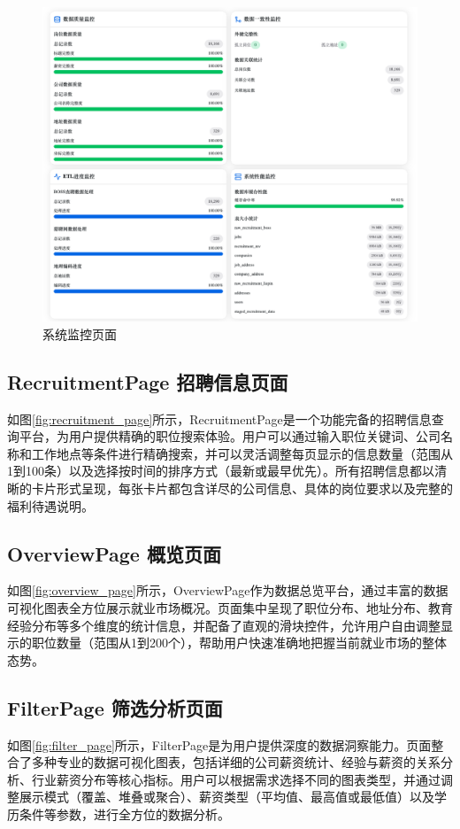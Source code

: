 \begin{figure}[htbp]
    \centering
    \includegraphics[width=1.0\textwidth]{figures/task_page2.png}
    \caption{系统监控页面}
    \label{fig:task_page_2}
\end{figure}


\subsection{RecruitmentPage 招聘信息页面}
如图\ref{fig:recruitment_page}所示，RecruitmentPage是一个功能完备的招聘信息查询平台，为用户提供精确的职位搜索体验。用户可以通过输入职位关键词、公司名称和工作地点等条件进行精确搜索，并可以灵活调整每页显示的信息数量（范围从1到100条）以及选择按时间的排序方式（最新或最早优先）。所有招聘信息都以清晰的卡片形式呈现，每张卡片都包含详尽的公司信息、具体的岗位要求以及完整的福利待遇说明。

\subsection{OverviewPage 概览页面}
如图\ref{fig:overview_page}所示，OverviewPage作为数据总览平台，通过丰富的数据可视化图表全方位展示就业市场概况。页面集中呈现了职位分布、地址分布、教育经验分布等多个维度的统计信息，并配备了直观的滑块控件，允许用户自由调整显示的职位数量（范围从1到200个），帮助用户快速准确地把握当前就业市场的整体态势。

\subsection{FilterPage 筛选分析页面}
如图\ref{fig:filter_page}所示，FilterPage是为用户提供深度的数据洞察能力。页面整合了多种专业的数据可视化图表，包括详细的公司薪资统计、经验与薪资的关系分析、行业薪资分布等核心指标。用户可以根据需求选择不同的图表类型，并通过调整展示模式（覆盖、堆叠或聚合）、薪资类型（平均值、最高值或最低值）以及学历条件等参数，进行全方位的数据分析。


